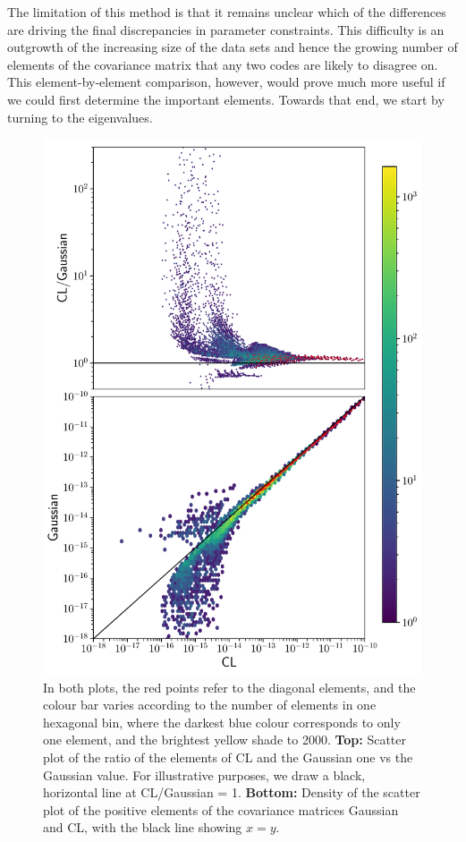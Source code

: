 \documentclass[twocolumn]{\docclass}
\begin{document}
	The limitation of this method is that it remains unclear which of the differences are driving the final discrepancies in parameter constraints. This difficulty is an outgrowth of the increasing size of the data sets and hence the growing number of elements of the covariance matrix that any two codes are likely to disagree on. This element-by-element comparison, however, would prove much more useful if we could first determine the important elements. Towards that end, we start by turning to the eigenvalues.
	
	\begin{figure}
		\includegraphics[width=0.9\columnwidth]{Scatter_CL-BJ.pdf}
		\caption{In both plots, the red points refer to the diagonal elements, and the colour bar varies according to the number of elements in one hexagonal bin, where the darkest blue colour corresponds to only one element, and the brightest yellow shade to 2000. \textbf{Top:} Scatter plot of the ratio of the elements of CL and the Gaussian one vs the Gaussian value. For illustrative purposes, we draw a black, horizontal line at CL/Gaussian = 1. \textbf{Bottom:} Density of the scatter plot of the positive elements of the covariance matrices Gaussian and CL, with the black line showing $x=y$.
			\label{fig:one-to-one}}
	\end{figure}
	
\end{document}
